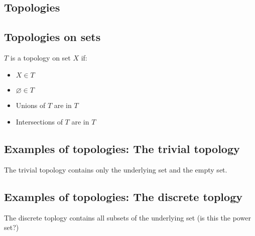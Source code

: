 
\subsection{Topologies}

\subsection{Topologies on sets}

\(T\) is a topology on set \(X\) if:

\begin{itemize}
\item \(X\in T\)
\item \(\varnothing \in T\)
\item Unions of \(T\) are in \(T\)
\item Intersections of \(T\) are in \(T\)
\end{itemize}


\subsection{Examples of topologies: The trivial topology}

The trivial topology contains only the underlying set and the empty set.

\subsection{Examples of topologies: The discrete toplogy}

The discrete toplogy contains all subsets of the underlying set (is this the power set?)

